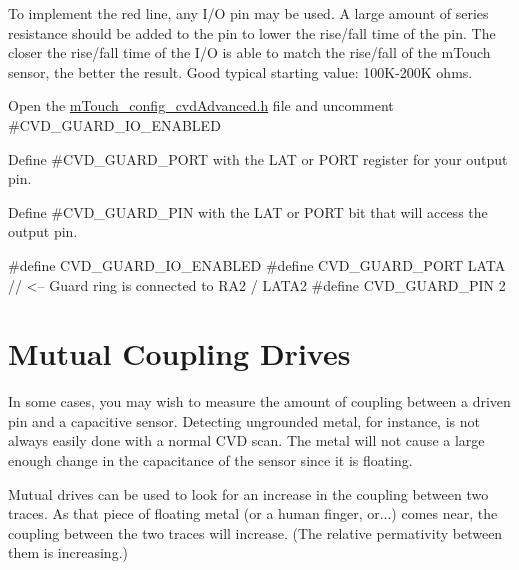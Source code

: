 To implement the red line, any I/\+O pin may be used. A large amount of series resistance should be added to the pin to lower the rise/fall time of the pin. The closer the rise/fall time of the I/\+O is able to match the rise/fall of the m\+Touch sensor, the better the result. Good typical starting value\+: 100\+K-\/200\+K ohms. 
\begin{DoxyEnumerate}
\item Open the \hyperlink{m_touch__config__cvd_advanced_8h}{m\+Touch\+\_\+config\+\_\+cvd\+Advanced.\+h} file and uncomment \#\+C\+V\+D\+\_\+\+G\+U\+A\+R\+D\+\_\+\+I\+O\+\_\+\+E\+N\+A\+B\+L\+E\+D 
\item Define \#\+C\+V\+D\+\_\+\+G\+U\+A\+R\+D\+\_\+\+P\+O\+R\+T with the L\+A\+T or P\+O\+R\+T register for your output pin. 
\item Define \#\+C\+V\+D\+\_\+\+G\+U\+A\+R\+D\+\_\+\+P\+I\+N with the L\+A\+T or P\+O\+R\+T bit that will access the output pin. 
\begin{DoxyCode}
\textcolor{preprocessor}{#define CVD\_GUARD\_IO\_ENABLED}
\textcolor{preprocessor}{#define CVD\_GUARD\_PORT        LATA        // <-- Guard ring is connected to RA2 / LATA2}
\textcolor{preprocessor}{#define CVD\_GUARD\_PIN         2           }
\end{DoxyCode}
 
\end{DoxyEnumerate}\hypertarget{featMutual}{}\section{Mutual Coupling Drives}\label{featMutual}
In some cases, you may wish to measure the amount of coupling between a driven pin and a capacitive sensor. Detecting ungrounded metal, for instance, is not always easily done with a normal C\+V\+D scan. The metal will not cause a large enough change in the capacitance of the sensor since it is floating.

Mutual drives can be used to look for an increase in the coupling between two traces. As that piece of floating metal (or a human finger, or...) comes near, the coupling between the two traces will increase. (The relative permativity between them is increasing.)

